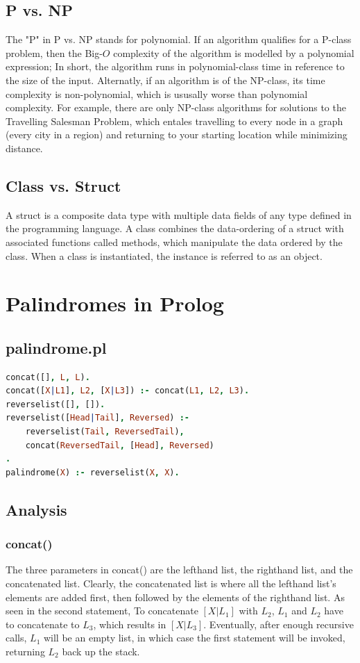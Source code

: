 \documentclass[12pt]{article}
\begin{document}
	\subsection{P vs. NP}
	The "P" in P vs. NP stands for polynomial. If an algorithm qualifies for a P-class problem, then the Big-$O$ complexity of the algorithm is modelled by a polynomial expression; In short, the algorithm runs in polynomial-class time in reference to the size of the input. Alternatly, if an algorithm is of the NP-class, its time complexity is non-polynomial, which is ususally worse than polynomial complexity. For example, there are only NP-class algorithms for solutions to the Travelling Salesman Problem, which entales travelling to every node in a graph (every city in a region) and returning to your starting location while minimizing distance.

	\subsection{Class vs. Struct}
	A struct is a composite data type with multiple data fields of any type defined in the programming language. A class combines the data-ordering of a struct with associated functions called methods, which manipulate the data ordered by the class. When a class is instantiated, the instance is referred to as an object.
	\pagebreak

	\section{Palindromes in Prolog}
	\subsection{palindrome.pl}
	\begin{lstlisting}[language = Prolog, tabsize = 8]
concat([], L, L).
concat([X|L1], L2, [X|L3]) :- concat(L1, L2, L3).
reverselist([], []).
reverselist([Head|Tail], Reversed) :-
	reverselist(Tail, ReversedTail),
	concat(ReversedTail, [Head], Reversed)
.
palindrome(X) :- reverselist(X, X).
	\end{lstlisting}
	\subsection{Analysis}
	\subsubsection{concat()}
	The three parameters in concat() are the lefthand list, the righthand list, and the concatenated list. Clearly, the concatenated list is where all the lefthand list's elements are added first, then followed by the elements of the righthand list. As seen in the second statement, To concatenate $[X|L_1]$ with $L_2$, $L_1$ and $L_2$ have to concatenate to $L_3$, which results in $[X|L_3]$. Eventually, after enough recursive calls, $L_1$ will be an empty list, in which case the first statement will be invoked, returning $L_2$ back up the stack.
\end{document}
